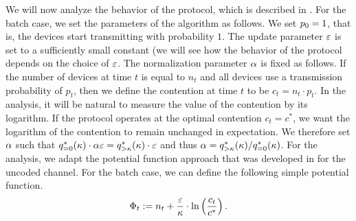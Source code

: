 We will now analyze the behavior of the protocol, which is described in . For the batch case, we set the parameters of the algorithm as follows. We set $p_0=1$, that is, the devices start transmitting with probability $1$. The update parameter $\varepsilon$ is set to a sufficiently small constant (we will see how the behavior of the protocol depends on the choice of $\varepsilon$. The normalization parameter $\alpha$ is fixed as follows. If the number of devices at time $t$ is equal to $n_t$ and all devices use a transmission probability of $p_t$, then we define the contention at time $t$ to be $c_t=n_t\cdot p_t$. In the analysis, it will be natural to measure the value of the contention by its logarithm. If the protocol operates at the optimal contention $c_t=c^*$, we want the logarithm of the contention to remain unchanged in expectation. We therefore set $\alpha$ such that $q_{=0}^*(\kappa)\cdot \alpha\varepsilon = q_{>\kappa}^*(\kappa)\cdot \varepsilon$ and thus $\alpha=q_{>\kappa}^*(\kappa)/q_{=0}^*(\kappa)$. For the analysis, we adapt the potential function approach that was developed in \cite{CJP19_simpleCR} for the uncoded channel. For the batch case, we can define the following simple potential function.
\[
\Phi_t := n_t + \frac{\varepsilon}{\kappa}\cdot\ln\left(\frac{c_t}{c^*}\right).
\]

